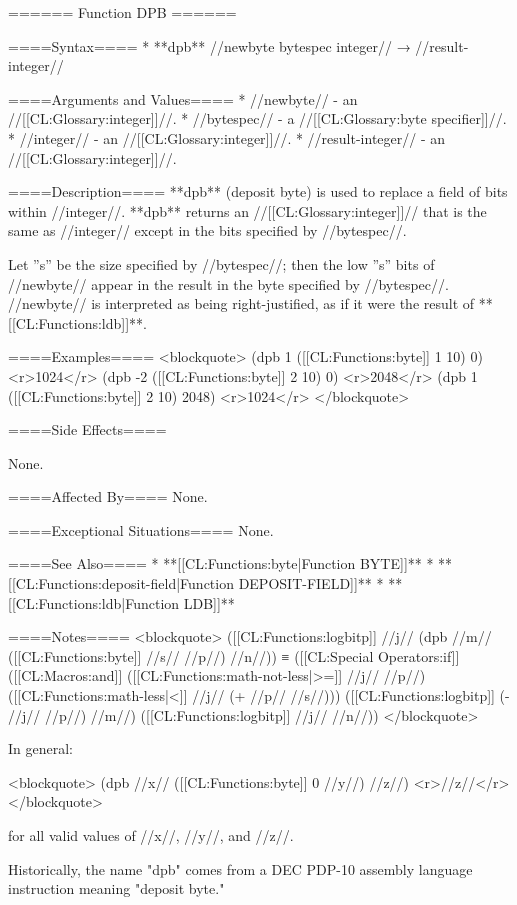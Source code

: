 ====== Function DPB ======

====Syntax====
  * **dpb** //newbyte bytespec integer// → //result-integer//

====Arguments and Values====
  * //newbyte// - an //[[CL:Glossary:integer]]//.
  * //bytespec// - a //[[CL:Glossary:byte specifier]]//.
  * //integer// - an //[[CL:Glossary:integer]]//.
  * //result-integer// - an //[[CL:Glossary:integer]]//.

====Description====
**dpb** (deposit byte) is used to replace a field of bits within //integer//. **dpb** returns an //[[CL:Glossary:integer]]// that is the same as //integer// except in the bits specified by //bytespec//.

Let ''s'' be the size specified by //bytespec//; then the low ''s'' bits of //newbyte// appear in the result in the byte specified by //bytespec//. //newbyte// is interpreted as being right-justified, as if it were the result of **[[CL:Functions:ldb]]**.

====Examples====
<blockquote>
(dpb 1 ([[CL:Functions:byte]] 1 10) 0) <r>1024</r>
(dpb -2 ([[CL:Functions:byte]] 2 10) 0) <r>2048</r>
(dpb 1 ([[CL:Functions:byte]] 2 10) 2048) <r>1024</r>
</blockquote>

====Side Effects====

None.

====Affected By====
None.

====Exceptional Situations====
None.

====See Also====
  * **[[CL:Functions:byte|Function BYTE]]**
  * **[[CL:Functions:deposit-field|Function DEPOSIT-FIELD]]**
  * **[[CL:Functions:ldb|Function LDB]]**

====Notes====
<blockquote>
([[CL:Functions:logbitp]] //j// (dpb //m// ([[CL:Functions:byte]] //s// //p//) //n//)) 
  ≡ ([[CL:Special Operators:if]] ([[CL:Macros:and]] ([[CL:Functions:math-not-less|>=]] //j// //p//) 
             ([[CL:Functions:math-less|<]] //j// (+ //p// //s//)))
        ([[CL:Functions:logbitp]] (- //j// //p//) //m//) 
        ([[CL:Functions:logbitp]] //j// //n//))
</blockquote>

In general:

<blockquote>
(dpb //x// ([[CL:Functions:byte]] 0 //y//) //z//) <r>//z//</r>
</blockquote>

for all valid values of //x//, //y//, and //z//.

Historically, the name "dpb" comes from a DEC PDP-10 assembly language instruction meaning "deposit byte."
